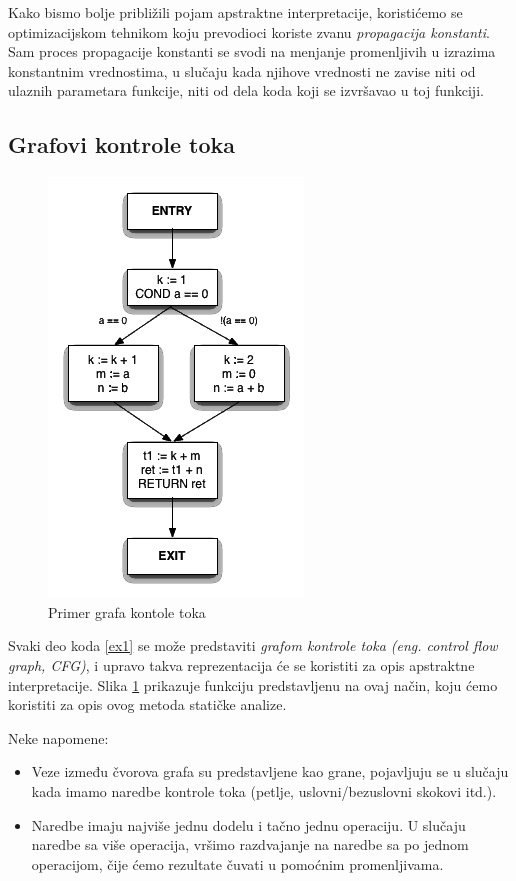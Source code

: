 Kako bismo bolje približili pojam apstraktne interpretacije, koristićemo se
optimizacijskom tehnikom koju prevodioci koriste zvanu \emph{propagacija konstanti}.
Sam proces propagacije konstanti se svodi na menjanje promenljivih u izrazima
konstantnim vrednostima, u slučaju kada njihove vrednosti ne zavise niti od
ulaznih parametara funkcije, niti od dela koda koji se izvršavao u toj funkciji.


\subsection{Grafovi kontrole toka}
\label{subsec:cfgs}

\begin{figure}[H]
\begin{center}
\includegraphics[scale=0.5]{Treehydra-cfg.png}
\end{center}
\caption{Primer grafa kontole toka}
\label{fig:graf}
\end{figure}

Svaki deo koda \ref{ex1} se može predstaviti \emph{grafom kontrole toka (eng. control flow graph, CFG)},
i upravo takva reprezentacija će se koristiti za opis apstraktne interpretacije.
Slika \ref{fig:graf} prikazuje funkciju predstavljenu na ovaj način, koju ćemo koristiti za
opis ovog metoda statičke analize.

Neke napomene:
\begin{itemize}
\item Veze između čvorova grafa su predstavljene kao grane, pojavljuju se u sluča\-ju
kada imamo naredbe kontrole toka (petlje, uslovni/bezuslovni skokovi itd.).
\item Naredbe imaju najviše jednu dodelu i tačno jednu operaciju. U slučaju naredbe
sa više operacija, vršimo razdvajanje na naredbe sa po jednom operacijom, čije
ćemo rezultate čuvati u pomoćnim promenljivama.
\end{itemize}


